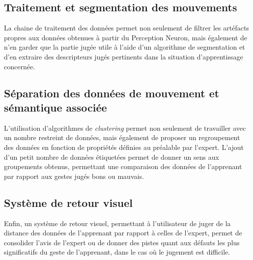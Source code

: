 \subsection{Traitement et segmentation des mouvements}
La chaine de traitement des données permet non seulement de filtrer les artéfacts propres aux données obtenues à partir du Perception Neuron, mais également de n'en garder que la partie jugée utile à l'aide d'un algorithme de segmentation et d'en extraire des descripteurs jugés pertinents dans la situation d'apprentissage concernée.

\subsection{Séparation des données de mouvement et sémantique associée}
L'utilisation d'algorithmes de \textit{clustering} permet non seulement de travailler avec un nombre restreint de données, mais également de proposer un regroupement des données en fonction de propriétés définies au préalable par l'expert. L'ajout d'un petit nombre de données étiquetées permet de donner un sens aux groupements obtenus, permettant une comparaison des données de l'apprenant par rapport aux gestes jugés bons ou mauvais.

\subsection{Système de retour visuel}
Enfin, un système de retour visuel, permettant à l'utilisateur de juger de la distance des données de l'apprenant par rapport à celles de l'expert, permet de consolider l'avis de l'expert ou de donner des pistes quant aux défauts les plus significatifs du geste de l'apprenant, dans le cas où le jugement est difficile.

